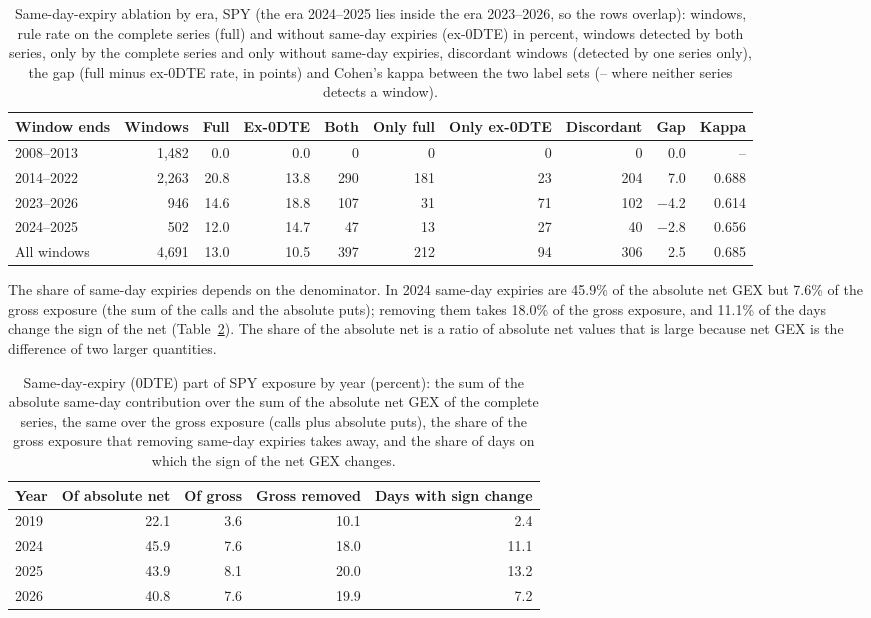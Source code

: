 \begin{table}[H]
\centering
\caption{Same-day-expiry ablation by era, SPY (the era 2024--2025 lies inside the era 2023--2026, so the rows overlap): windows, rule rate on the complete series (full) and without same-day expiries (ex-0DTE) in percent, windows detected by both series, only by the complete series and only without same-day expiries, discordant windows (detected by one series only), the gap (full minus ex-0DTE rate, in points) and Cohen's kappa between the two label sets (-- where neither series detects a window).}
\label{tab:stored:era}
\footnotesize
\setlength{\tabcolsep}{3pt}
\begin{tabular}{@{}lrrrrrrrrr@{}}
\toprule
Window ends & Windows & Full & Ex-0DTE & Both & Only full & Only ex-0DTE & Discordant & Gap & Kappa \\
\midrule
2008--2013 & 1{,}482 & 0.0 & 0.0 & 0 & 0 & 0 & 0 & 0.0 & -- \\
2014--2022 & 2{,}263 & 20.8 & 13.8 & 290 & 181 & 23 & 204 & 7.0 & 0.688 \\
2023--2026 & 946 & 14.6 & 18.8 & 107 & 31 & 71 & 102 & $-$4.2 & 0.614 \\
2024--2025 & 502 & 12.0 & 14.7 & 47 & 13 & 27 & 40 & $-$2.8 & 0.656 \\
All windows & 4{,}691 & 13.0 & 10.5 & 397 & 212 & 94 & 306 & 2.5 & 0.685 \\
\bottomrule
\end{tabular}
\end{table}

The share of same-day expiries depends on the denominator. In 2024 same-day expiries are 45.9\% of the absolute net GEX but 7.6\% of the gross exposure (the sum of the calls and the absolute puts); removing them takes 18.0\% of the gross exposure, and 11.1\% of the days change the sign of the net (Table~\ref{tab:stored:share}). The share of the absolute net is a ratio of absolute net values that is large because net GEX is the difference of two larger quantities.

\begin{table}[H]
\centering
\caption{Same-day-expiry (0DTE) part of SPY exposure by year (percent): the sum of the absolute same-day contribution over the sum of the absolute net GEX of the complete series, the same over the gross exposure (calls plus absolute puts), the share of the gross exposure that removing same-day expiries takes away, and the share of days on which the sign of the net GEX changes.}
\label{tab:stored:share}
\footnotesize
\begin{tabular}{@{}lrrrr@{}}
\toprule
Year & Of absolute net & Of gross & Gross removed & Days with sign change \\
\midrule
2019 & 22.1 & 3.6 & 10.1 & 2.4 \\
2024 & 45.9 & 7.6 & 18.0 & 11.1 \\
2025 & 43.9 & 8.1 & 20.0 & 13.2 \\
2026 & 40.8 & 7.6 & 19.9 & 7.2 \\
\bottomrule
\end{tabular}
\end{table}

